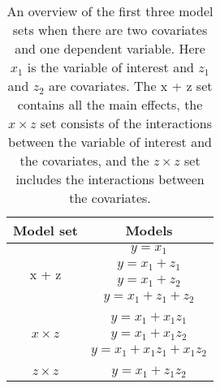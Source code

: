 \begin{table}[]
\caption{}
\caption*{\footnotesize An overview of the first three model sets when there are two covariates and one dependent variable. Here $x_1$ is the variable of interest and $z_1$ and $z_2$ are covariates. The x + z set contains all the main effects, the $x \times z$ set consists of the interactions between the variable of interest and the covariates, and the $z \times z$ set includes the interactions between the covariates.}
\label{modelsets1}
\centering
\begin{tabular}{cc}
\toprule
Model set & Models \\ 
\midrule
\multirow{4}{*}{x + z} & $y=x_1$ \\ & $y=x_1+z_1$ \\ & $y=x_1+z_2$ \\ & $y=x_1+z_1+z_2$  \\ & \\
\multirow{3}{*}{$x \times z$} & $y=x_1+x_1z_1$ \\ & $y=x_1+x_1z_2$ \\ & $y=x_1+x_1z_1+x_1z_2$  \\& \\
$z \times z$ & $y=x_1+z_1z_2$ \\ 
\bottomrule
\end{tabular}
\end{table}
